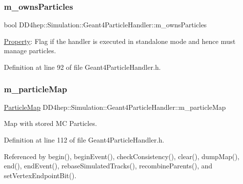 \subsubsection{\texorpdfstring{m\+\_\+owns\+Particles}{m\_ownsParticles}}
{\footnotesize\ttfamily bool D\+D4hep\+::\+Simulation\+::\+Geant4\+Particle\+Handler\+::m\+\_\+owns\+Particles\hspace{0.3cm}{\ttfamily [protected]}}



\hyperlink{class_d_d4hep_1_1_property}{Property}\+: Flag if the handler is executed in standalone mode and hence must manage particles. 



Definition at line 92 of file Geant4\+Particle\+Handler.\+h.

\hypertarget{class_d_d4hep_1_1_simulation_1_1_geant4_particle_handler_a9f1973d25638be1fbfad9166a681d765}{}\label{class_d_d4hep_1_1_simulation_1_1_geant4_particle_handler_a9f1973d25638be1fbfad9166a681d765} 
\subsubsection{\texorpdfstring{m\+\_\+particle\+Map}{m\_particleMap}}
{\footnotesize\ttfamily \hyperlink{class_d_d4hep_1_1_simulation_1_1_geant4_particle_handler_a79cf5fe4ceb492dff4d3458306a08973}{Particle\+Map} D\+D4hep\+::\+Simulation\+::\+Geant4\+Particle\+Handler\+::m\+\_\+particle\+Map\hspace{0.3cm}{\ttfamily [protected]}}



Map with stored MC Particles. 



Definition at line 112 of file Geant4\+Particle\+Handler.\+h.



Referenced by begin(), begin\+Event(), check\+Consistency(), clear(), dump\+Map(), end(), end\+Event(), rebase\+Simulated\+Tracks(), recombine\+Parents(), and set\+Vertex\+Endpoint\+Bit().

\hypertarget{class_d_d4hep_1_1_simulation_1_1_geant4_particle_handler_a7b305cc199ec643d3014483dcc8a93b2}{}\label{class_d_d4hep_1_1_simulation_1_1_geant4_particle_handler_a7b305cc199ec643d3014483dcc8a93b2} 
